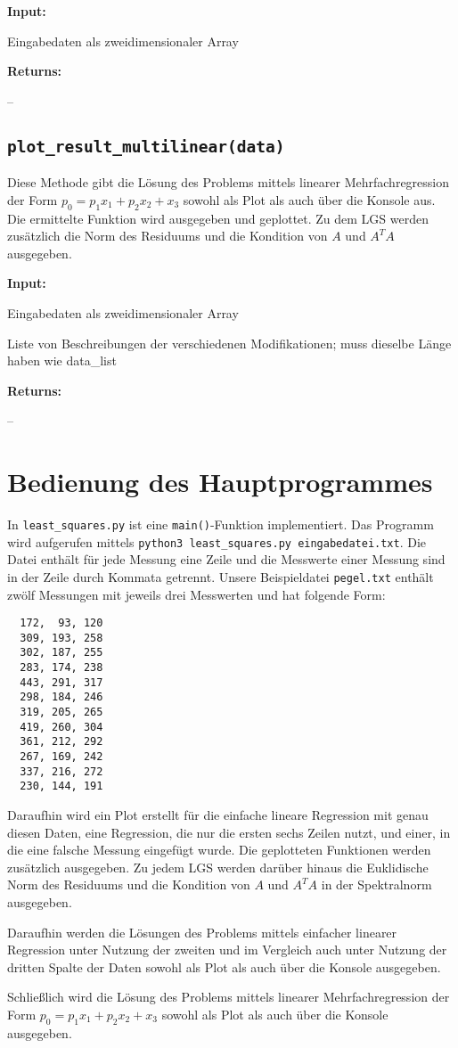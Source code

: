 \documentclass[smallheadings]{scrartcl}
\newcommand{\initem}[2]{\item[\hspace{0.5em} {\normalfont\ttfamily{#1}} {\normalfont\itshape{(#2)}}]}
\newcommand{\outitem}[1]{\item[\hspace{0.5em} \normalfont\itshape{(#1)}]}
\newcommand{\bfpara}[1]{\noindent \textbf{#1:}\,}
\begin{document}
\bfpara{Input}
    \begin{compactdesc}
		    \initem{data}{2d-array} Eingabedaten als zweidimensionaler Array
		\end{compactdesc}
\bfpara{Returns}
    \begin{compactdesc}
		  \outitem{None} --
	  \end{compactdesc}

\subsection{\texttt{plot\_result\_multilinear(data)}}
Diese Methode gibt die Lösung des Problems mittels linearer Mehrfachregression der Form $p_0 = p_1 x_1 +p_2 x_2+x_3$ sowohl als Plot als auch über die Konsole aus.
Die ermittelte Funktion wird ausgegeben und geplottet.
Zu dem LGS werden zusätzlich die Norm des Residuums und die Kondition von $A$ und $A^T A$ ausgegeben.

\bfpara{Input}
    \begin{compactdesc}
		    \initem{data}{2d-array} Eingabedaten als zweidimensionaler Array
		    \initem{labels}{list of strings} Liste von Beschreibungen der verschiedenen Modifikationen; muss dieselbe Länge haben wie data\_list
		\end{compactdesc}
\bfpara{Returns}
    \begin{compactdesc}
		  \outitem{None} --
	  \end{compactdesc}
\pagebreak
\section{Bedienung des Hauptprogrammes}
In \texttt{least\_squares.py} ist eine \texttt{main()}-Funktion implementiert.
Das Programm wird aufgerufen mittels \texttt{python3 least\_squares.py eingabedatei.txt}.
Die Datei enthält für jede Messung eine Zeile und die Messwerte einer Messung sind in der Zeile durch Kommata getrennt.
Unsere Beispieldatei \texttt{pegel.txt} enthält zwölf Messungen mit jeweils drei Messwerten und hat folgende Form:

\begin{verbatim}
  172,  93, 120
  309, 193, 258
  302, 187, 255
  283, 174, 238
  443, 291, 317
  298, 184, 246
  319, 205, 265
  419, 260, 304
  361, 212, 292
  267, 169, 242
  337, 216, 272
  230, 144, 191
\end{verbatim}

Daraufhin wird ein Plot erstellt für die einfache lineare Regression mit genau diesen Daten, eine Regression, die nur die ersten sechs Zeilen nutzt, und einer, in die eine falsche Messung eingefügt wurde.
Die geplotteten Funktionen werden zusätzlich ausgegeben.
Zu jedem LGS werden darüber hinaus die Euklidische Norm des Residuums und die Kondition von $A$ und $A^T A$ in der Spektralnorm ausgegeben.

Daraufhin werden die Lösungen des Problems mittels einfacher linearer Regression unter Nutzung der zweiten und im Vergleich auch unter Nutzung der dritten Spalte der Daten sowohl als Plot als auch über die Konsole ausgegeben.

Schließlich wird die Lösung des Problems mittels linearer Mehrfachregression der Form $p_0 = p_1 x_1 +p_2 x_2+x_3$ sowohl als Plot als auch über die Konsole ausgegeben.
\end{document}
